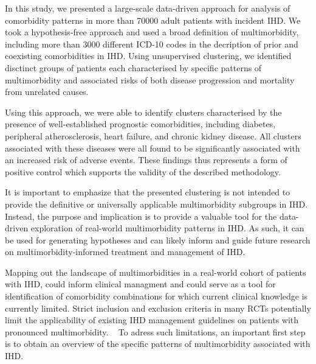 In this study, we presented a large-scale data-driven approach
for analysis of comorbidity patterns in more than \num{70000} adult 
patients with incident \ac{IHD}.
We took a hypothesis-free approach and used a broad definition of 
multimorbidity, including more than \num{3000} different \ac{ICD-10} codes in
the decription of prior and coexisting comorbidities in \ac{IHD}.
Using unsupervised clustering, we identified disctinct groups of patients 
each characterised by specific patterns of multimorbidity and associated
risks of both disease progression and mortality from unrelated causes.

Using this approach, we were able to identify clusters characterised by
the presence of well-established prognostic comorbidities, including
diabetes, peripheral atherosclerosis, heart failure, and chronic kidney
disease. 
All clusters associated with these diseases
were all found to be significantly associated with an 
increased risk of adverse events. 
These findings thus represents a form of positive control
which supports the validity of the described methodology.

It is important to emphasize that the presented clustering is not
intended to provide the definitive or universally applicable 
multimorbidity subgroups in \ac{IHD}. 
Instead, the purpose and implication is to provide a valuable tool
for the data-driven exploration of real-world multimorbidity patterns
in \ac{IHD}.
As such, it can be used for generating hypotheses and can likely inform
and guide future research on multimorbidity-informed
treatment and management of \ac{IHD}.

Mapping out the landscape of multimorbidities in a real-world cohort of 
patients with \ac{IHD}, could inform clinical managment and could serve
as a tool for identification of comorbidity combinations for which
current clinical knowledge is currently limited.
Strict inclusion and exclusion criteria in many \acp{RCT} 
potentially limit the applicability of existing \ac{IHD} 
management guidelines on patients with pronounced multimorbidity.
~\autocite{richKnowledge2016}
To adress such limitations, an important first step is to obtain an overview
of the specific patterns of multimorbidity associated with \ac{IHD}.
